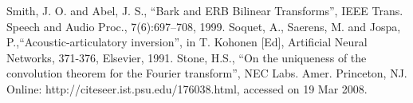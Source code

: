 \documentclass[a4paper]{article}
\begin{document}
\newpage
%
\eightpt

\begin{thebibliography}{10}
 Smith, J. O. and Abel, J. S., 
``Bark and {ERB} Bilinear Transforms'', 
IEEE Trans. Speech and Audio Proc., 7(6):697--708, 1999.  
 Soquet, A., Saerens, M. and Jospa, P.,``Acoustic-articulatory
inversion'', in T. Kohonen [Ed], Artificial Neural Networks, 371-376,
Elsevier, 1991.
 Stone, H.S., ``On the uniqueness of the convolution theorem
for the Fourier transform'', NEC Labs. Amer. Princeton, NJ. 
Online: http://citeseer.ist.psu.edu/176038.html, accessed on 19 Mar 2008.
\end{thebibliography}
\end{document}
